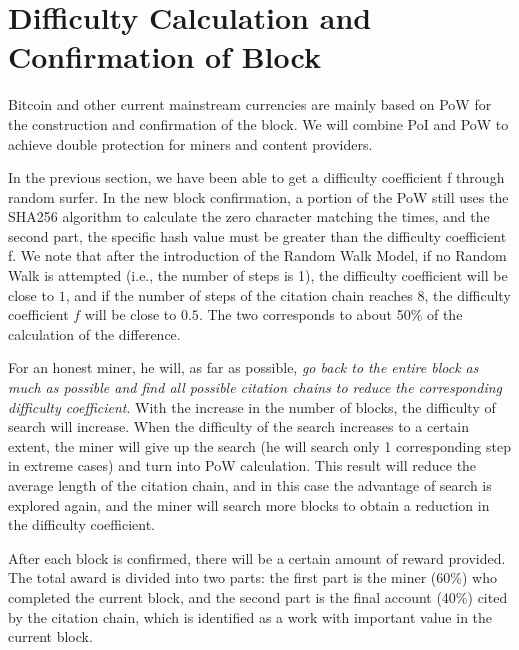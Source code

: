 \documentclass[a4paper,oneside,openany]{tufte-book}
\begin{document}
\section{Difficulty Calculation and Confirmation of Block}


Bitcoin and other current mainstream currencies are mainly based on PoW for the construction and confirmation of the block. We will combine PoI and PoW to achieve double protection for miners and content providers.



In the previous section, we have been able to get a difficulty coefficient f through random surfer. In the new block confirmation, a portion of the PoW still uses the SHA256 algorithm to calculate the zero character matching the times, and the second part, the specific hash value must be greater than the difficulty coefficient f. We note that after the introduction of the Random Walk Model, if no Random Walk is attempted (i.e., the number of steps is 1), the difficulty coefficient will be close to $1$, and if the number of steps of the citation chain reaches 8, the difficulty coefficient $f$ will be close to $0.5$. The two corresponds to about 50\% of the calculation of the difference.



For an honest miner, he will, as far as possible, \emph{go back to the entire block as much as possible and find all possible citation chains to reduce the corresponding difficulty coefficient}. With the increase in the number of blocks, the difficulty of search will increase. When the difficulty of the search increases to a certain extent, the miner will give up the search (he will search only 1 corresponding step in extreme cases) and turn into PoW calculation. This result will reduce the average length of the citation chain, and in this case the advantage of search is explored again, and the miner will search more blocks to obtain a reduction in the difficulty coefficient.


After each block is confirmed, there will be a certain amount of reward provided. The total award is divided into two parts: the first part is the miner (60\%) who completed the current block, and the second part is the final account (40\%) cited by the citation chain, which is identified as a work with important value in the current block.
\end{document}
